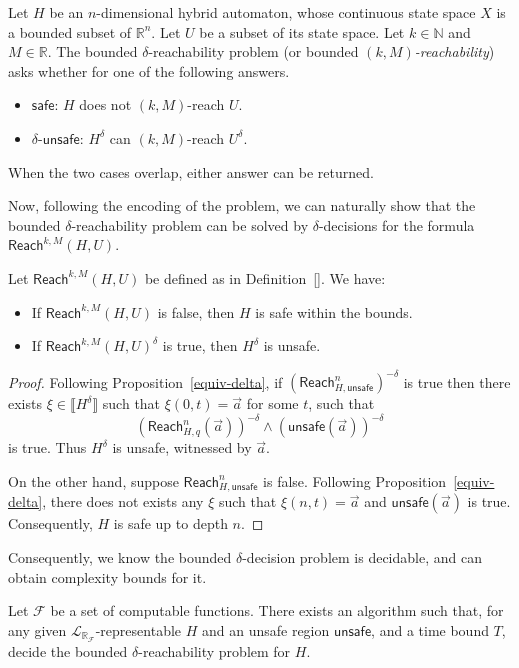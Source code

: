 \documentclass[envcountsect]{llncs}
\newcommand{\reach}{\mathsf{Reach}}
\newcommand{\unsafe}{\mathsf{unsafe}}
\newcommand{\safe}{\mathsf{safe}}
\newcommand{\lrf}{\mathcal{L}_{\mathbb{R}_{\mathcal{F}}}}
\begin{document}
\begin{definition}
Let $H$ be an $n$-dimensional hybrid automaton, whose continuous state space
$X$ is a bounded subset of $\mathbb{R}^n$. Let $U$ be a subset of its state
space. Let $k\in \mathbb{N}$ and $M \in \mathbb{R}$. The {bounded
$\delta$-reachability problem} (or bounded {\em $(k,M)$-reachability}) asks
whether for one of the following answers. 
\begin{itemize}
\item $\safe$: $H$ does not $(k, M)$-reach $U$. 
\item $\delta$-$\unsafe$: $H^{\delta}$ can $(k,M)$-reach $U^{\delta}$.
\end{itemize}
When the two cases overlap, either answer can be returned.
\end{definition}
Now, following the encoding of the problem, we can naturally show that the
bounded $\delta$-reachability problem can be solved by $\delta$-decisions for
the formula $\reach^{k,M}(H,U)$. 
\begin{lemma}\label{bmclemma}
Let $\reach^{k,M}(H,U)$ be defined as in Definition~\ref{}. We have:
\begin{itemize}
\item If $\reach^{k,M}(H,U) $ is false, then $H$ is safe within the bounds. 
\item If $\reach^{k,M}(H,U)^{\delta}$ is true, then $H^{\delta}$ is unsafe.
\end{itemize}
\end{lemma}
\begin{proof}
Following Proposition~\ref{equiv-delta}, if $(\reach^n_{H,\unsafe})^{-\delta}$
is true then there exists $\xi\in \llbracket H^{\delta}\rrbracket$ such that
$\xi(0,t)=\vec a$ for some $t$, such that
$$(\reach^n_{H,q}(\vec a))^{-\delta} \wedge (\unsafe(\vec a))^{-\delta}$$
is true. Thus $H^{\delta}$ is unsafe, witnessed by $\vec a$.

On the other hand, suppose $\reach^n_{H,\unsafe}$ is false. Following
Proposition~\ref{equiv-delta}, there does not exists any $\xi$ such that
$\xi(n,t) = \vec a$ and $\unsafe(\vec a)$ is true. Consequently, $H$ is safe up
to depth $n$. 
\end{proof}

Consequently, we know the bounded $\delta$-decision problem is decidable, and
can obtain complexity bounds for it. 

\begin{theorem}[Decidability]
Let $\mathcal{F}$ be a set of computable functions. There exists an algorithm
such that, for any given $\lrf$-representable $H$ and an unsafe region
$\unsafe$, and a time bound $T$, decide the bounded $\delta$-reachability
problem for $H$.
\end{theorem}
\end{document}
